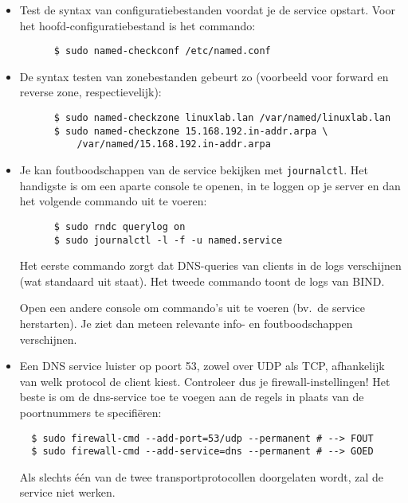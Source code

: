 \begin{itemize}
  \item Test de syntax van configuratiebestanden voordat je de service opstart. Voor het hoofd-configuratiebestand  is het commando:
    \begin{verbatim}
      $ sudo named-checkconf /etc/named.conf
    \end{verbatim}
  \item De syntax testen van zonebestanden gebeurt zo (voorbeeld voor forward en reverse zone, respectievelijk):

    \begin{verbatim}
      $ sudo named-checkzone linuxlab.lan /var/named/linuxlab.lan
      $ sudo named-checkzone 15.168.192.in-addr.arpa \
          /var/named/15.168.192.in-addr.arpa
    \end{verbatim}

  \item Je kan foutboodschappen van de service bekijken met \texttt{journalctl}. Het handigste is om een aparte console te openen, in te loggen op je server en dan het volgende commando uit te voeren:

    \begin{verbatim}
      $ sudo rndc querylog on
      $ sudo journalctl -l -f -u named.service
    \end{verbatim}

  Het eerste commando zorgt dat DNS-queries van clients in de logs verschijnen (wat standaard uit staat). Het tweede commando toont de logs van BIND.

  Open een andere console om commando's uit te voeren (bv.\ de service herstarten). Je ziet dan meteen relevante info- en foutboodschappen verschijnen.
  
  \item Een DNS service luister op poort 53, zowel over UDP als TCP, afhankelijk van welk protocol de client kiest. Controleer dus je firewall-instellingen! Het beste is om de dns-service toe te voegen aan de regels in plaats van de poortnummers te specifiëren:
  
  \begin{verbatim}
  $ sudo firewall-cmd --add-port=53/udp --permanent # --> FOUT
  $ sudo firewall-cmd --add-service=dns --permanent # --> GOED  
  \end{verbatim}
  
  Als slechts één van de twee transportprotocollen doorgelaten wordt, zal de service niet werken.
\end{itemize}

